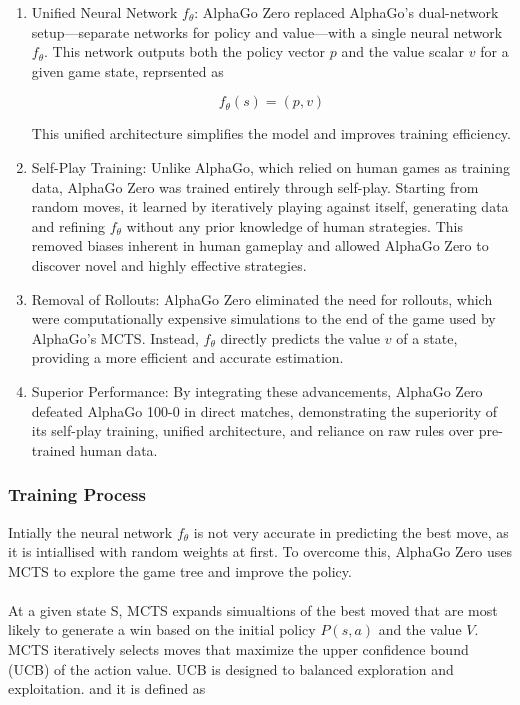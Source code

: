 \begin{enumerate}
    \item Unified Neural Network \( f_\theta \): AlphaGo Zero replaced AlphaGo's
          dual-network setup—separate networks for policy and value—with a single neural
          network \( f_\theta \). This network outputs both the policy vector \( p \) and
          the value scalar \( v \) for a given game state, reprsented as

          \begin{equation}
              f_\theta(s) = (p, v)
          \end{equation}

          This unified architecture simplifies the model and improves training
          efficiency.

    \item Self-Play Training: Unlike AlphaGo, which relied on human games as training
          data, AlphaGo Zero was trained entirely through self-play. Starting from random
          moves, it learned by iteratively playing against itself, generating data and
          refining \( f_\theta \) without any prior knowledge of human strategies. This
          removed biases inherent in human gameplay and allowed AlphaGo Zero to discover
          novel and highly effective strategies.

    \item Removal of Rollouts: AlphaGo Zero eliminated the need for rollouts, which were
          computationally expensive simulations to the end of the game used by AlphaGo's
          MCTS. Instead, \( f_\theta \) directly predicts the value \( v \) of a state,
          providing a more efficient and accurate estimation.

    \item Superior Performance: By integrating these advancements, AlphaGo Zero defeated
          AlphaGo 100-0 in direct matches, demonstrating the superiority of its self-play
          training, unified architecture, and reliance on raw rules over pre-trained
          human data.
\end{enumerate}

\subsubsection{Training Process}

Intially the neural network \( f_\theta \) is not very accurate in predicting
the best move, as it is intiallised with random weights at first. To overcome
this, AlphaGo Zero uses MCTS to explore the game tree and improve the policy.
\\\\ At a given state S, MCTS expands simualtions of the best moved that are
most likely to generate a win based on the initial policy $P(s,a)$ and the
value $V$. MCTS iteratively selects moves that maximize the upper confidence
bound (UCB) of the action value. UCB is designed to balanced exploration and
exploitation. and it is defined as

